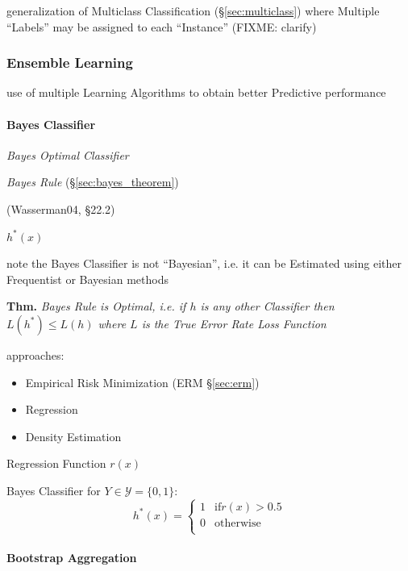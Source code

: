 generalization of Multiclass Classification (\S\ref{sec:multiclass}) where
Multiple ``Labels'' may be assigned to each ``Instance'' (FIXME: clarify)



\subsubsection{Ensemble Learning}\label{sec:ensemble_learning}

use of multiple Learning Algorithms to obtain better Predictive performance



\paragraph{Bayes Classifier}\label{sec:bayes_classifier}\hfill

\emph{Bayes Optimal Classifier}

\emph{Bayes Rule} (\S\ref{sec:bayes_theorem})

(Wasserman04, \S22.2)

$h^*(x)$

note the Bayes Classifier is not ``Bayesian'', i.e. it can be Estimated using
either Frequentist or Bayesian methods

\textbf{Thm.} \emph{Bayes Rule is Optimal, i.e. if $h$ is any other Classifier
  then $L(h^*) \leq L(h)$ where $L$ is the True Error Rate Loss Function}

approaches:
\begin{itemize}
  \item Empirical Risk Minimization (ERM \S\ref{sec:erm})
  \item Regression
  \item Density Estimation
\end{itemize}

Regression Function $r(x)$

Bayes Classifier for $Y \in \mathcal{Y} = \{0, 1\}$:
\[
  h^*(x) = \begin{cases}
    1 & \text{if} r(x) > 0.5 \\
    0 & \text{otherwise} \\
  \end{cases}
\]



\paragraph{Bootstrap Aggregation}\label{sec:bootstrap_aggregation}\hfill

